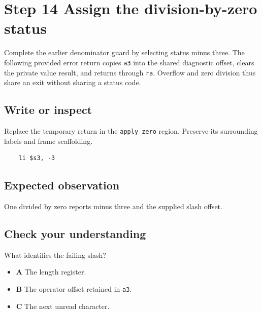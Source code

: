 \section{Step 14 Assign the division-by-zero status}\label{expression-s14}

Complete the earlier denominator guard by selecting status minus three. The following provided error return copies \texttt{a3} into the shared diagnostic offset, clears the private value result, and returns through \texttt{ra}. Overflow and zero division thus share an exit without sharing a status code.

\subsection{Write or inspect}
Replace the temporary return in the \texttt{apply\_zero} region. Preserve its surrounding labels and frame scaffolding.

\begin{verbatim}
    li $s3, -3
\end{verbatim}
\subsection{Expected observation}
One divided by zero reports minus three and the supplied slash offset.

\subsection{Check your understanding}
What identifies the failing slash?

\begin{itemize}
  \item \textbf{A} The length register.
  \item \textbf{B} The operator offset retained in \texttt{a3}.
  \item \textbf{C} The next unread character.
\end{itemize}
